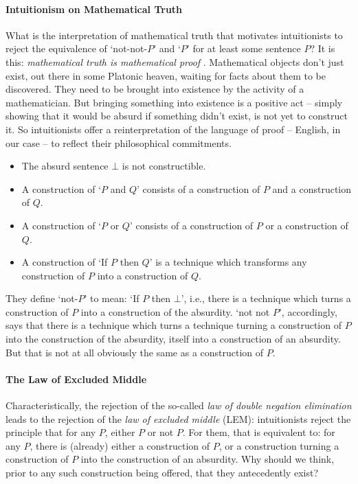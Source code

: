 \paragraph{Intuitionism on Mathematical Truth} What is the interpretation of mathematical truth that motivates intuitionists to reject the equivalence of `not-not-$P$' and `$P$' for at least some sentence $P$? It is this: \emph{mathematical truth is mathematical proof} \citep{shap}. Mathematical objects don't just exist, out there in some Platonic heaven, waiting for facts about them to be discovered. They need to be brought into existence by the activity of a mathematician. But bringing something into existence is a positive act – simply showing that it would be absurd if something didn't exist, is not yet to construct it. So intuitionists offer a reinterpretation of the language of proof – English, in our case – to reflect their philosophical commitments. \begin{itemize}
  \item The absurd sentence $\bot$ is not constructible.
\item A construction of `$P$ and $Q$' consists of a construction of $P$ and a construction of $Q$.
\item A construction of `$P$ or $Q$' consists of a construction of $P$ or a construction of $Q$.
\item A construction of `If $P$ then $Q$' is a technique which transforms any construction of $P$ into a construction of $Q$.
\end{itemize} They define `not-$P$' to mean: `If $P$ then $\bot$', i.e., there is a technique which turns a construction of $P$ into a construction of the absurdity. `not not $P$', accordingly, says that there is a technique which turns a technique turning a construction of $P$ into the construction of the absurdity, itself into a construction of an absurdity. But that is not at all obviously the same as a construction of $P$.

\paragraph{The Law of Excluded Middle} Characteristically, the rejection of the so-called \emph{law of double negation elimination} leads to the rejection of the \emph{law of excluded middle} (LEM): intuitionists reject the principle that for any $P$, either $P$ or not $P$. For them, that is equivalent to: for any $P$, there is (already) either a construction of $P$, or a construction turning a construction of $P$ into the construction of an absurdity. Why should we think, prior to any such construction being offered, that they antecedently exist? 

